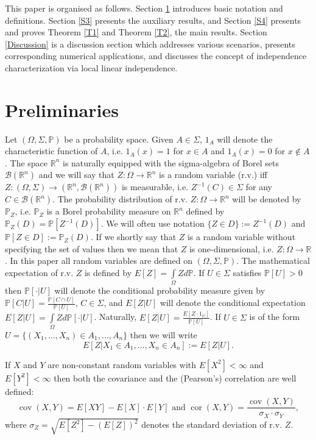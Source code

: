 \documentclass[sn-mathphys,Numbered,11pt]{sn-jnl}%
\theoremstyle{thmstyleone}%
\newcommand{\R}{\mathbb{R}}
\newcommand{\PP}{\mathbb{P}}
\newcommand{\BB}{\mathcal{B}(\R^n)}
\newcommand{\cov}{\operatorname{cov}}
\newcommand{\cor}{\operatorname{cor}}
\begin{document}
This paper is organised as follows. Section \ref{S2} introduces basic notation and definitions. Section \ref{S3} presents the auxiliary results, and  Section \ref{S4} presents and proves  Theorem \ref{T1} and Theorem \ref{T2}, the main results. Section \ref{Discussion} is a discussion section which addresses various scenarios, presents corresponding numerical applications,  and discusses the concept of  independence characterization via local linear independence.





\section{Preliminaries}\label{S2}
Let $(\Omega,\Sigma,\PP)$ be a probability space. Given $A\in\Sigma$, $1_A$ will denote the characteristic function of $A$, i.e. $1_A(x)=1$ for $x\in A$ and $1_A(x)=0$ for $x\notin A$. The space $\R^n$ is naturally equipped with the sigma-algebra of Borel sets $\BB$ and  we will say that $Z\colon\Omega\to\R^n$ is a random variable (r.v.) iff $Z\colon (\Omega,\Sigma)\to (\R^n,\BB)$ is measurable, i.e. $Z^{-1}(C)\in\Sigma$ for any $C\in\BB$. The probability distribution of r.v. $Z\colon\Omega\to \R^n$ will be denoted by $\PP_Z$, i.e. $\PP_Z$ is a Borel probability measure on $\R^n$ defined by $\PP_Z(D)=\PP[Z^{-1}(D)]$. We will often use notation $\{Z\in D\}:= Z^{-1}(D)$ and $\PP[Z\in D]:=\PP_Z(D)$. If we shortly say that $Z$ is a random variable without specifying the set of values then we mean that $Z$ is one-dimensional, i.e. $Z\colon \Omega\to\R$. In this paper all random variables are defined on $(\Omega,\Sigma,\PP)$. The mathematical expectation of r.v. $Z$ is defined by $E[Z]=\int\limits_{\Omega}Zd\PP$. If $U\in\Sigma$ satisfies $\PP[U]>0$ then $\PP[\cdot|U]$ will denote the conditional probability measure given by $\PP[C|U]=\frac{\PP[C\cap U]}{\PP[U]}$, $C\in\Sigma$, and $E[Z|U]$ will denote the conditional expectation $E[Z|U]=\int\limits_{\Omega}Zd\PP[\cdot|U]$. Naturally, $E[Z|U]=\frac{E[Z\cdot 1_U]}{\PP[U]}$.  If $U\in\Sigma$ is of the form $U=\{(X_1,\dots,X_n)\in A_1,\dots,A_n\}$ then we will  write 
$$E[Z|X_1\in A_1,\dots,X_n\in A_n]:=E[Z|U].$$ 


 If $X$ and $Y$ are non-constant random variables with $E[X^2]<\infty$ and $E[Y^2]<\infty$ then both the covariance and the (Pearson's) correlation are well defined:
$$\cov(X,Y)=E[XY]-E[X]\cdot E[Y]\mbox{ \ and \  }\cor(X,Y)=\frac{\cov(X,Y)}{\sigma_X\cdot \sigma_Y},$$
where  $\sigma_Z=\sqrt{E[Z^2]-(E[Z])^2}$ denotes the standard deviation of r.v. $Z$.
\end{document}

